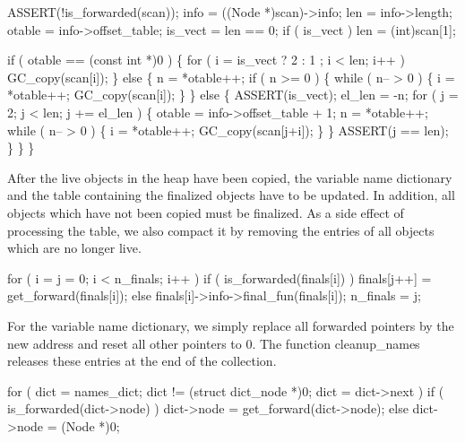     ASSERT(!is_forwarded(scan));
    info    = ((Node *)scan)->info;
    len     = info->length;
    otable  = info->offset_table;
    is_vect = len == 0;
    if ( is_vect )
        len = (int)scan[1];

    if ( otable == (const int *)0 )
    \{
        for ( i = is_vect ? 2 : 1 ; i < len; i++ )
            GC_copy(scan[i]);
    \}
    else
    \{
        n = *otable++;
        if ( n >= 0 )
        \{
            while ( n-- > 0 )
            \{
                i = *otable++;
                GC_copy(scan[i]);
            \}
        \}
        else
        \{
            ASSERT(is_vect);
            el_len = -n;
            for ( j = 2; j < len; j += el_len )
            \{
                otable = info->offset_table + 1;
                n      = *otable++;
                while ( n-- > 0 )
                \{
                    i = *otable++;
                    GC_copy(scan[j+i]);
                \}
            \}
            ASSERT(j == len);
        \}
    \}
\}

\nwendcode{}\nwdocspar
After the live objects in the heap have been copied, the variable
name dictionary and the table containing the finalized objects have
to be updated.  In addition, all objects which have not been copied
must be finalized. As a side effect of processing the table, we also
compact it by removing the entries of all objects which are no longer
live.

\nwenddocs{}\endmoddef\nwstartdeflinemarkup{}\nwenddeflinemarkup
for ( i = j = 0; i < n_finals; i++ )
    if ( is_forwarded(finals[i]) )
        finals[j++] = get_forward(finals[i]);
    else
        finals[i]->info->final_fun(finals[i]);
n_finals = j;

\nwendcode{}\nwdocspar
For the variable name dictionary, we simply replace all forwarded
pointers by the new address and reset all other pointers to {\Tt{}0\nwendquote}. The
function {\Tt{}cleanup{\_}names\nwendquote} releases these entries at the end of the
collection.

\nwenddocs{}\endmoddef\nwstartdeflinemarkup{}\nwenddeflinemarkup
for ( dict = names_dict; dict != (struct dict_node *)0; dict = dict->next )
    if ( is_forwarded(dict->node) )
        dict->node = get_forward(dict->node);
    else
        dict->node = (Node *)0;

